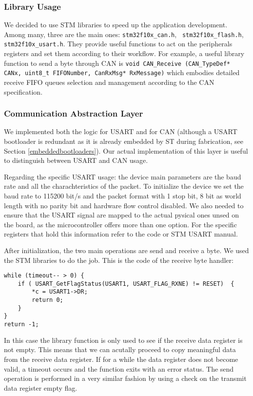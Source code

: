 \documentclass[11pt]{article} %
\begin{document}
\subsubsection{Library Usage}
We decided to use STM libraries to speed up the application development. Among many, three are the main ones: \texttt{stm32f10x\_can.h}, \texttt{ stm32f10x\_flash.h},  \texttt{ stm32f10x\_usart.h}. They provide useful functions to act on the peripherals registers and set them according to their workflow. For example, a useful library function to send a byte through CAN is \texttt{void CAN\_Receive (CAN\_TypeDef* CANx, uint8\_t FIFONumber, CanRxMsg* RxMessage)} which embodies detailed receive FIFO queues selection and management according to the CAN specification.

\subsubsection{Communication Abstraction Layer}
We implemented both the logic for USART and for CAN (although a USART bootloader is redundant as it is already embedded by ST during fabrication, see Section \ref{embeddedbootloaders}). Our actual implementation of this layer is useful to distinguish between USART and CAN usage.

Regarding the specific USART usage: the device main parameters are the baud rate and all the charachteristics of the packet. To initialize the device we set the baud rate to 115200 bit/s and the packet format with 1 stop bit, 8 bit as world length with no parity bit and hardware flow control disabled. We also needed to ensure that the USART signal are mapped to the actual pysical ones unsed on the board, as the microcontroller offers more than one option. For the specific registers that hold this information refer to the code or STM USART manual. 

After initialization, the two main operations are send and receive a byte. We used the STM libraries to do the job. This is the code of the receive byte handler:
\begin{verbatim}
while (timeout-- > 0) {
    if ( USART_GetFlagStatus(USART1, USART_FLAG_RXNE) != RESET)  {
        *c = USART1->DR;
        return 0;
    }
}
return -1;
\end{verbatim}
In this case the library function is only used to see if the receive data register is not empty. This means that we can acutally proceed to copy meaningful data from the receive data register. If for a while the data register does not become valid, a timeout occurs and the function exits with an error status. The send operation is performed in a very similar fashion by using a check on the transmit data register empty flag.
\end{document}
